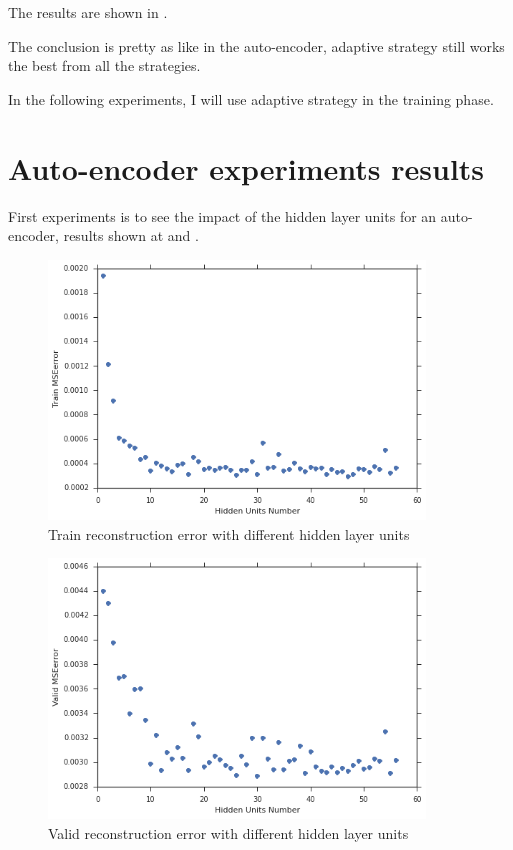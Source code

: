 The results are shown in .


The conclusion is pretty as like in the auto-encoder, adaptive strategy still works the best from all the strategies.

In the following experiments, I will use adaptive strategy in the training phase.
\section{Auto-encoder experiments results}


First experiments is to see the impact of the hidden layer  units for an auto-encoder, results shown at  and .
\begin{figure}[htbp]
	\centering
	\includegraphics[width=10cm]{Figures/1.png}
	\caption[Train reconstruction error with different hidden layer units]{Train reconstruction error with different hidden layer units}
	\label{fig:1}
\end{figure}
\begin{figure}[htbp]
	\centering
	\includegraphics[width=10cm]{Figures/2.png}
	\caption[Valid reconstruction error with different hidden layer units]{Valid reconstruction error with different hidden layer units}
	\label{fig:2}
\end{figure}

